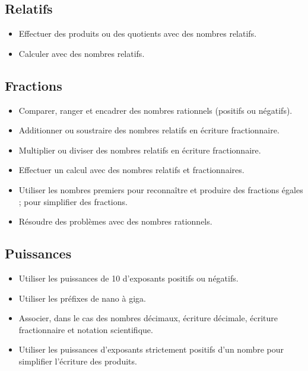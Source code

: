 \documentclass[a4paper,12pt,fleqn]{article}	
\begin{document}
\renewcommand{\labelitemi}{}

\subsection*{Relatifs}

\begin{itemize}
	\item {}Effectuer des produits ou des quotients avec des nombres relatifs.
	\item {}Calculer avec des nombres relatifs.
\end{itemize}

\subsection*{Fractions}

\begin{itemize}
	\item {}Comparer, ranger et encadrer des nombres rationnels (positifs ou négatifs).
	\item {}Additionner ou soustraire des nombres relatifs en écriture fractionnaire.
	\item {}Multiplier ou diviser des nombres relatifs en écriture fractionnaire.
	\item {}Effectuer un calcul avec des nombres relatifs et fractionnaires.
	\item {}Utiliser les nombres premiers pour reconnaître et produire des fractions égales ; pour simplifier des fractions.
	\item {}Résoudre des problèmes avec des nombres rationnels.
\end{itemize}

\subsection*{Puissances}

\begin{itemize}
	\item {}Utiliser les puissances de 10 d’exposants positifs ou négatifs.
	\item {}Utiliser les préfixes de nano à giga.
	\item {}Associer, dans le cas des nombres décimaux, écriture décimale, écriture fractionnaire et notation scientifique.
	\item {}Utiliser les puissances d’exposants strictement positifs d’un nombre pour simplifier l’écriture des produits.
\end{itemize}
\end{document}
